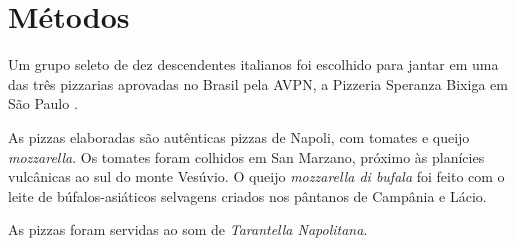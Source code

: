 \section{Métodos}

Um grupo seleto de dez descendentes italianos foi escolhido
para jantar em uma das três pizzarias aprovadas no 
Brasil pela AVPN, a Pizzeria Speranza Bixiga 
em São Paulo \cite{AVPN}.

As pizzas elaboradas são autênticas pizzas de Napoli, com tomates e queijo
\textsl{mozzarella}.  Os tomates foram colhidos em San Marzano, próximo às 
planícies vulcânicas ao sul do monte Vesúvio.  O queijo
\textsl{mozzarella di bufala} foi feito com o leite de búfalos-asiáticos 
selvagens criados nos pântanos de Campânia e Lácio.

As pizzas foram servidas ao som de \textsl{Tarantella Napolitana}.

